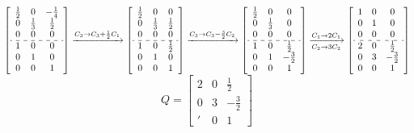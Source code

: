 \begin{enumerate}[label=\color{red}\textbf{\arabic*)}, leftmargin=*]
\begin{enumerate}[label=\color{red}\alph*)]
$\left[\begin{array}{ccc}
\frac{1}{2} & 0 & -\frac{1}{4} \\ 
0 & \frac{1}{3} & \frac{1}{2} \\ 
0 & 0 & 0 \\ \hdashline
1 & 0 & 0 \\ 
0 & 1 & 0 \\ 
0 & 0 & 1
\end{array} \right]\xrightarrow{C_3\to C_3+\frac{1}{2}C_1}\left[\begin{array}{ccc}
\frac{1}{2} & 0 & 0 \\ 
0 & \frac{1}{3} & \frac{1}{2} \\ 
0 & 0 & 0 \\ \hdashline
1 & 0 & \frac{1}{2} \\ 
0 & 1 & 0 \\ 
0 & 0 & 1
\end{array} \right]\xrightarrow{C_3\to C_3-\frac{3}{2}C_2}\left[\begin{array}{ccc}
\frac{1}{2} & 0 & 0 \\ 
0 & \frac{1}{3} & 0 \\ 
0 & 0 & 0 \\ \hdashline
1 & 0 & \frac{1}{2} \\ 
0 & 1 & -\frac{3}{2} \\ 
0 & 0 & 1
\end{array} \right]\xrightarrow[C_2\to3C_2]{C_1\to 2C_1}\left[\begin{array}{ccc}
1 & 0 & 0 \\ 
0 & 1 & 0 \\ 
0 & 0 & 0 \\ \hdashline
2 & 0 & \frac{1}{2} \\ 
0 & 3 & -\frac{3}{2} \\ 
0 & 0 & 1
\end{array} \right]$ \[Q=\begin{bmatrix}
2 & 0 & \frac{1}{2}\\
0 & 3 & -\frac{3}{2}\\
' & 0 & 1
\end{bmatrix}\]


\end{enumerate}
\end{enumerate}
